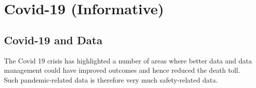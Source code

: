 %
%
\chapter{Covid-19 (Informative)} \label{bkm:Covid19}



\section{Covid-19 and Data}
The Covid 19 crisis has highlighted a number of areas where better data and data management could have improved outcomes and hence reduced the death toll. Such pandemic-related data is therefore very much safety-related data. 

